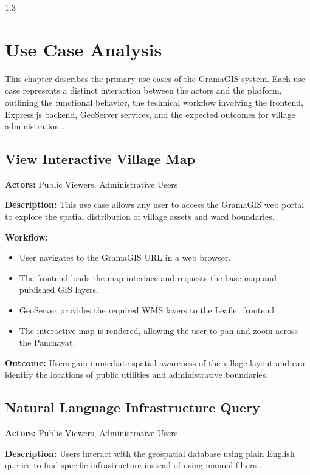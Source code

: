 ﻿\newpage
\thispagestyle{empty}
%
\begin{spacing}{1.3}
%
\chapter{Use Case Analysis}

This chapter describes the primary use cases of the GramaGIS system. Each use case represents a distinct interaction between the actors and the platform, outlining the functional behavior, the technical workflow involving the frontend, Express.js backend, GeoServer services, and the expected outcomes for village administration \cite{fu2020webgis}.

\section{View Interactive Village Map}

\textbf{Actors:} Public Viewers, Administrative Users

\textbf{Description:}
This use case allows any user to access the GramaGIS web portal to explore the spatial distribution of village assets and ward boundaries.

\textbf{Workflow:}
\begin{itemize}
    \item User navigates to the GramaGIS URL in a web browser.
    \item The frontend loads the map interface and requests the base map and published GIS layers.
    \item GeoServer provides the required WMS layers to the Leaflet frontend \cite{fu2020webgis}.
    \item The interactive map is rendered, allowing the user to pan and zoom across the Panchayat.
\end{itemize}

\textbf{Outcome:}
Users gain immediate spatial awareness of the village layout and can identify the locations of public utilities and administrative boundaries.

\section{Natural Language Infrastructure Query}

\textbf{Actors:} Public Viewers, Administrative Users

\textbf{Description:}
Users interact with the geospatial database using plain English queries to find specific infrastructure instead of using manual filters \cite{liu2025nalspatial}.


\end{spacing}
